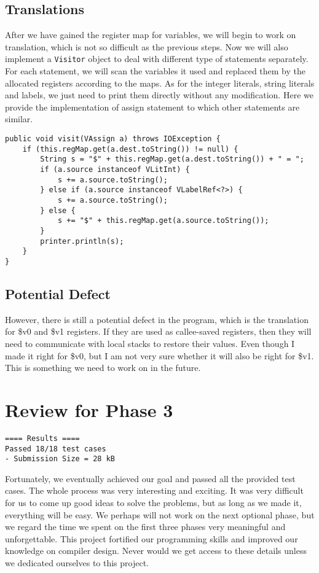 \documentclass[letterpaper, 14pt]{article}
\begin{document}
\subsection{Translations}

After we have gained the register map for variables, we will begin to work on translation, which is not so difficult as the previous steps. Now we will also implement a \texttt{Visitor} object to deal with different type of statements separately. For each statement, we will scan the variables it used and replaced them by the allocated registers according to the maps. As for the integer literals, string literals and labels, we just need to print them directly without any modification. Here we provide the implementation of assign statement to which other statements are similar. 
\begin{lstlisting}
public void visit(VAssign a) throws IOException {
	if (this.regMap.get(a.dest.toString()) != null) {
		String s = "$" + this.regMap.get(a.dest.toString()) + " = ";
		if (a.source instanceof VLitInt) {
			s += a.source.toString();
		} else if (a.source instanceof VLabelRef<?>) {
			s += a.source.toString();
		} else {
			s += "$" + this.regMap.get(a.source.toString());
		}
		printer.println(s);
	}
}
\end{lstlisting}

\subsection{Potential Defect}

However, there is still a potential defect in the program, which is the translation for \$v0 and \$v1 registers. If they are used as callee-saved registers, then they will need to communicate with local stacks to restore their values. Even though I made it right for \$v0, but I am not very sure whether it will also be right for \$v1. This is something we need to work on in the future. 

\section{Review for Phase 3}

\begin{lstlisting}
==== Results ====
Passed 18/18 test cases
- Submission Size = 28 kB
\end{lstlisting}

Fortunately, we eventually achieved our goal and passed all the provided test cases. The whole process was very interesting and exciting. It was very difficult for us to come up good ideas to solve the problems, but as long as we made it, everything will be easy. We perhaps will not work on the next optional phase, but we regard the time we spent on the first three phases very meaningful and unforgettable. This project fortified our programming skills and improved our knowledge on compiler design. Never would we get access to these details unless we dedicated ourselves to this project. 
\end{document}
